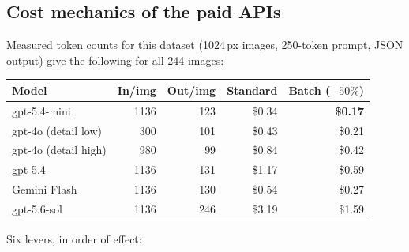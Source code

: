 \documentclass[11pt,a4paper]{article}
\begin{document}
\subsection{Cost mechanics of the paid APIs}

Measured token counts for this dataset (1024\,px images, 250-token prompt,
JSON output) give the following for all 244 images:

\begin{center}
\begin{tabular}{lrrrr}
\toprule
\textbf{Model} & \textbf{In/img} & \textbf{Out/img} & \textbf{Standard} & \textbf{Batch ($-50\%$)} \\
\midrule
gpt-5.4-mini      & 1136 & 123 & \$0.34 & \textbf{\$0.17} \\
gpt-4o (detail low) & 300 & 101 & \$0.43 & \$0.21 \\
gpt-4o (detail high) & 980 & 99 & \$0.84 & \$0.42 \\
gpt-5.4           & 1136 & 131 & \$1.17 & \$0.59 \\
Gemini Flash      & 1136 & 130 & \$0.54 & \$0.27 \\
gpt-5.6-sol       & 1136 & 246 & \$3.19 & \$1.59 \\
\bottomrule
\end{tabular}
\end{center}

\noindent Six levers, in order of effect:
\end{document}
